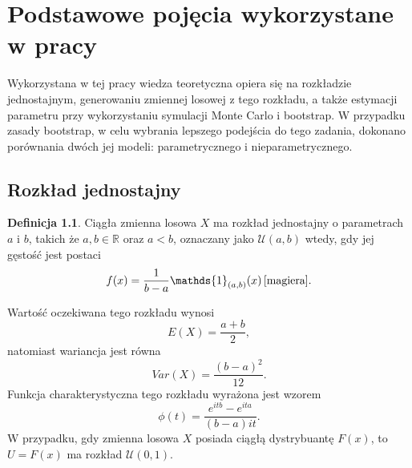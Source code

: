 \documentclass[inzynierska]{pwr_wmat_praca_dyplomowa}
\theoremstyle{plain}
\numberwithin{theorem}{chapter}
\theoremstyle{definition}
\numberwithin{theorem}{chapter}
\newtheorem{definition}[theorem]{Definicja}
\begin{document}
\chapter{Podstawowe pojęcia wykorzystane w pracy}
Wykorzystana w tej pracy wiedza teoretyczna opiera się na rozkładzie jednostajnym, generowaniu zmiennej losowej z tego rozkładu, a także estymacji parametru przy wykorzystaniu symulacji Monte Carlo i bootstrap. W przypadku zasady bootstrap, w celu wybrania lepszego podejścia do tego zadania, dokonano porównania dwóch jej modeli: parametrycznego i nieparametrycznego.   

\section{Rozkład jednostajny}
\begin{definition}
Ciągła zmienna losowa $X$ ma rozkład jednostajny o parametrach $a$ i $b$, takich że $a,b\in \mathds{R}$ oraz $a<b$, oznaczany jako $\mathcal{U}(a,b)$ wtedy, gdy jej gęstość jest postaci
\begin{equation}
f(x)=\frac{1}{b-a}\mathds{1}_{(a,b)}(x) \,\cite{magiera}.
\end{equation}
\end{definition}
\noindent Wartość oczekiwana tego rozkładu wynosi
\begin{equation}
E(X)=\frac{a+b}{2},
\end{equation}
natomiast wariancja jest równa
\begin{equation}
Var(X)=\frac{(b-a)^2}{12}.
\end{equation} 
Funkcja charakterystyczna tego rozkładu wyrażona jest wzorem
\begin{equation}
\phi(t)=\frac{e^{itb}-e^{ita}}{(b-a)it}.
\end{equation}
W przypadku, gdy zmienna losowa $X$ posiada ciągłą dystrybuantę $F(x)$, to $U=F(x)$ ma rozkład $\mathcal{U}(0,1)$.
\end{document}
